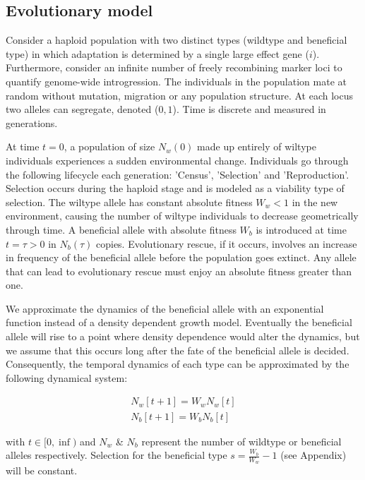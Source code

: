 \documentclass[a4paper,10pt]{article}
\begin{document}
\subsection*{Evolutionary model}
Consider a haploid population with two distinct types (wildtype and beneficial type) in which adaptation is determined by a single large effect gene ($i$). Furthermore, consider an infinite number of freely recombining marker loci to quantify genome-wide introgression. The individuals in the population mate at random without mutation, migration or any population structure. At each locus two alleles can segregate, denoted ($0,1$). Time is discrete and measured in generations.

At time $t=0$, a population of size $N_w(0)$ made up entirely of wiltype individuals experiences a sudden environmental change. Individuals go through the following lifecycle each generation: 'Census', 'Selection' and 'Reproduction'. Selection occurs during the haploid stage and is modeled as a viability type of selection. The wiltype allele has constant absolute fitness $W_w<1$ in the new environment, causing the number of wiltype individuals to decrease geometrically through time. A beneficial allele with absolute fitness $W_b$ is introduced at time $t=\tau > 0$ in $N_b(\tau)$ copies. Evolutionary rescue, if it occurs, involves an increase in frequency of the beneficial allele before the population goes extinct. Any allele that can lead to evolutionary rescue must enjoy an absolute fitness greater than one. 

We approximate the dynamics of the beneficial allele with an exponential function instead of a density dependent growth model. Eventually the beneficial allele will rise to a point where density dependence would alter the dynamics, but we assume that this occurs long after the fate of the beneficial allele is decided. Consequently, the temporal dynamics of each type can be approximated by the following dynamical system:
    
\begin{equation}
\begin{array}{l}
N_w[t+1] = W_w N_w[t] \\
N_b[t+1] = W_b N_b[t]
\end{array}
\end{equation}

with $t \in [0,\inf) $ and $N_w$ \& $N_b$ represent the number of wildtype or beneficial alleles respectively. Selection for the beneficial type $s = \frac{W_b}{W_w}-1$ (see Appendix) will be constant.
\end{document}
